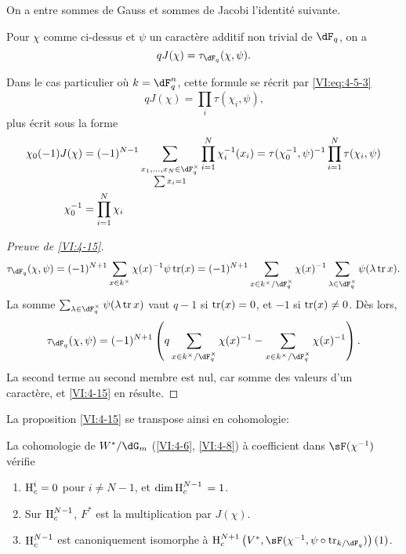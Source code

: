 On a entre sommes de Gauss et sommes de Jacobi l'identit\'e suivante. 





\begin{proposition_}\label{VI:4-15}
Pour $\chi$ comme ci-dessus et $\psi$ un caract\`ere additif non trivial de 
$\dF_q$, on a 
\[
  q J(\chi) = \tau_{\dF_q}(\chi,\psi) \text{.} 
\]
\end{proposition_}

Dans le cas particulier o\`u $k=\dF_q^n$, cette formule se r\'ecrit par 
\eqref{VI:eq:4-5-3} 
\begin{equation*}\tag{4.15.1}\label{VI:eq:4-15-1}
  q J(\chi) = \prod_i \tau(\chi_i,\psi) \text{,} 
\end{equation*}
plus \'ecrit sous la forme 
\begin{align*}
  \chi_0(-1) J(\chi) &= (-1)^{N-1} \sum_{\substack{x_1,\dots,x_N\in \dF_q^\times \\ \sum x_i = 1}} \prod_{i=1}^N \chi_i^{-1}(x_i) = \tau(\chi_0^{-1},\psi)^{-1} \prod_{i=1}^N \tau(\chi_i,\psi) \\
  \chi_0^{-1} &= \prod_{i=1}^N \chi_i 
\end{align*}





\begin{proof}[Preuve de \ref{VI:4-15}]
\[
  \tau_{\dF_q}(\chi,\psi) = (-1)^{N+1} \sum_{x\in k^\times} \chi(x)^{-1} \psi \tr(x) = (-1)^{N+1} \sum_{x\in k^\times/\dF_q^\times} \chi(x)^{-1} \sum_{\lambda\in \dF_q^\times} \psi(\lambda \tr x) \text{.}
\]
La somme $\sum_{\lambda\in \dF_q^\times} \psi(\lambda \tr x)$ vaut $q-1$ si 
$\operatorname{tr}(x)=0$, et $-1$ si $\operatorname{tr}(x)\ne 0$. D\`es lors, 
\[
  \tau_{\dF_q}(\chi,\psi) = (-1)^{N+1} \left(q\sum_{x\in k^\times/\dF_q^\times} \chi(x)^{-1} - \sum_{x\in k^\times/\dF_q^\times} \chi(x)^{-1}\right) \text{.}
\]
La second terme au second membre est nul, car somme des valeurs d'un 
caract\`ere, et \ref{VI:4-15} en r\'esulte. 
\end{proof}

La proposition \ref{VI:4-15} se transpose ainsi en cohomologie: 





\begin{proposition_}\label{VI:4-16}
La cohomologie de $W^\ast/\dG_m$ (\ref{VI:4-6}, \ref{VI:4-8}) \`a coefficient 
dans $\sF(\chi^{-1})$ v\'erifie 
\begin{enumerate}[\indent (i)]
  \item $\operatorname{H}_c^i=0$ pour $i\ne N-1$, et $\dim \operatorname{H}_c^{N-1}{}=1$. 
  \item Sur $\operatorname{H}_c^{N-1}$, $F^\ast$ est la multiplication par $J(\chi)$. 
  \item $\operatorname{H}_c^{N-1}$ est canoniquement isomorphe \`a 
    $\h_c^{N+1}\left(V^\ast,\sF(\chi^{-1},\psi\circ \tr_{k/\dF_q})\right)(1)$. 
\end{enumerate}
\end{proposition_}

